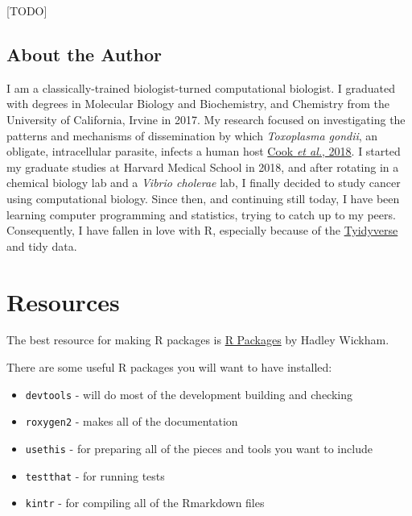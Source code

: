 \documentclass[]{book}
\providecommand{\tightlist}{%
  \setlength{\itemsep}{0pt}\setlength{\parskip}{0pt}}
\begin{document}
{[}TODO{]}

\hypertarget{about-the-author}{%
\subsection*{About the Author}\label{about-the-author}}

I am a classically-trained biologist-turned computational biologist. I graduated with degrees in Molecular Biology and Biochemistry, and Chemistry from the University of California, Irvine in 2017. My research focused on investigating the patterns and mechanisms of dissemination by which \emph{Toxoplasma gondii}, an obligate, intracellular parasite, infects a human host \href{https://www.ncbi.nlm.nih.gov/pubmed/29295815}{Cook \emph{et al.}, 2018}. I started my graduate studies at Harvard Medical School in 2018, and after rotating in a chemical biology lab and a \emph{Vibrio cholerae} lab, I finally decided to study cancer using computational biology. Since then, and continuing still today, I have been learning computer programming and statistics, trying to catch up to my peers. Consequently, I have fallen in love with R, especially because of the \href{https://www.tidyverse.org}{Tyidyverse} and tidy data.

\hypertarget{resources}{%
\section*{Resources}\label{resources}}

The best resource for making R packages is \href{https://r-pkgs.org/index.html}{R Packages} by Hadley Wickham.

There are some useful R packages you will want to have installed:

\begin{itemize}
\tightlist
\item
  \texttt{devtools} - will do most of the development building and checking
\item
  \texttt{roxygen2} - makes all of the documentation
\item
  \texttt{usethis} - for preparing all of the pieces and tools you want to include
\item
  \texttt{testthat} - for running tests
\item
  \texttt{kintr} - for compiling all of the Rmarkdown files
\end{itemize}
\end{document}

